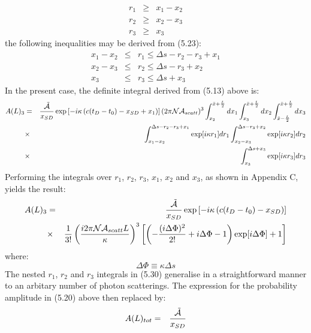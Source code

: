{      \begin{eqnarray}
       r_1 & \ge & x_1-x_2 \\
       r_2 & \ge & x_2-x_3 \\
       r_3 & \ge & x_3
       \end{eqnarray}
      the following inequalities may be derived from (5.23):
      \begin{eqnarray}
   x_1-x_2 & \le & r_1 \le  \Delta s-r_2-r_3+x_1 \\
   x_2-x_3 & \le & r_2 \le  \Delta s-r_3+x_2 \\
   x_3 & \le &  r_3 \le  \Delta s+x_3
    \end{eqnarray}
    In the present case, the definite integral derived from (5.13) above is:
    \begin{eqnarray}
   A(L)_3 & = & \frac{\tilde{{\cal A}}}{x_{SD}}
   \exp\left[ - i \kappa\left(c(t_D-t_0)-x_{SD}+x_1 \right)\right](2 \pi {\cal N}{\cal A}_{scatt})^3
   \int_{x_2}^{\bar{x} +\frac{L}{2}} d x_1  \int_{x_3}^{\bar{x} +\frac{L}{2}} d x_2
   \int_{\bar{x} -\frac{L}{2}}^{\bar{x} +\frac{L}{2}} dx_3 
   \nonumber \\
      & \times &  \int_{x_1-x_2}^{\Delta s-r_2-r_3+x_1} \exp[i\kappa r_1]  d r_1
   \int_{x_2-x_3}^{\Delta s-r_3+x_2} \exp[i\kappa r_2]  d r_2
    \nonumber \\
     & \times & \int_{x_3}^{\Delta s+x_3} \exp[i\kappa r_3]  d r_3 
  \end{eqnarray}
  Performing the integrals over $r_1$, $r_2$, $r_3$, $x_1$, $x_2$ and $x_3$, as shown in
   Appendix C, yields the result:
   \begin{eqnarray}
     A(L)_3 & = & \frac{\tilde{{\cal A}}}{x_{SD}}
      \exp\left[ - i \kappa\left(c(t_D-t_0)-x_{SD}\right)\right] \nonumber \\
       & \times  & \frac{1}{3!}\left(\frac{i 2 \pi {\cal N}{\cal A}_{scatt} L}{\kappa}\right)^3
        \left[\left(-\frac{(i\Delta \Phi)^2}{2!} + i \Delta \Phi -1\right)\exp[i \Delta \Phi]+1\right]
    \end{eqnarray}
     where:
     \begin{equation}
     \Delta \Phi \equiv \kappa  \Delta s
     \end{equation}
     The nested $r_1$, $r_2$ and $r_3$ integrals in (5.30) generalise in a straightforward
     manner to an arbitary number of photon scatterings. The expression for the probability amplitude
     in (5.20) above then replaced by:
  \begin{eqnarray}
      A(L)_{tot} & = &  \frac{\tilde{{\cal A}}}{x_{SD}}

\end{eqnarray}}
